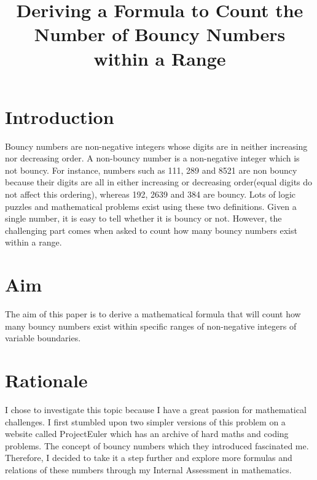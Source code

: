 \documentclass[titlepage,12pt]{article}
\date{}
\title{Deriving a Formula to Count the Number of Bouncy Numbers within a Range}
\begin{document}
\makeatletter
{}
\makeatother

\newpage
\small
\tableofcontents
\pagestyle{empty}
\newpage

\section{Introduction}
\pagestyle{plain}
\setcounter{page}{1}
Bouncy numbers are non-negative integers whose digits are in neither increasing nor decreasing order\cite{OEIS}. A non-bouncy number is a non-negative integer which is not bouncy. For instance, numbers such as 111, 289 and 8521 are non bouncy because their digits are all in either increasing or decreasing order(equal digits do not affect this ordering), whereas 192, 2639 and 384 are bouncy.
Lots of logic puzzles and mathematical problems exist using these two definitions. Given a single number, it is easy to tell whether it is bouncy or not.
However, the challenging part comes when asked to count how many bouncy numbers exist within a range.

\section{Aim}
The aim of this paper is to derive a mathematical formula that will count how many bouncy numbers exist within specific ranges of non-negative integers of variable boundaries.

\section{Rationale}
I chose to investigate this topic because I have a great passion for mathematical challenges. I first stumbled upon two simpler versions of this problem\cite{ProjectEuler112}\cite{ProjectEuler113} on a website called ProjectEuler which has an archive of hard maths and coding problems.
The concept of bouncy numbers which they introduced fascinated me. Therefore, I decided to take it a step further and explore more formulas and relations of these numbers through my Internal Assessment in mathematics.
\end{document}
